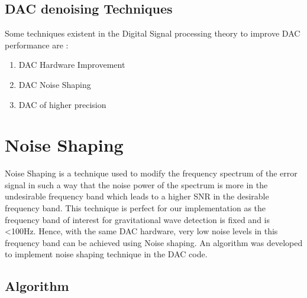 \documentclass[colorlinks=true,pdfstartview=FitV,linkcolor=blue,
            citecolor=red,urlcolor=magenta]{ligodoc}
\begin{document}
    \subsection{DAC denoising Techniques}
    Some techniques existent in the Digital Signal processing theory to improve DAC performance are :
    
    		\begin{enumerate}
    			\item DAC Hardware Improvement
    			\item DAC Noise Shaping
    			\item DAC of higher precision
    		\end{enumerate}
\section{Noise Shaping}
	Noise Shaping is a technique used to modify the frequency spectrum of the error signal in such a way that the noise power of the spectrum is more in the undesirable frequency band which leads to a higher SNR in the desirable frequency band. This technique is perfect for our implementation as the frequency band of interest for gravitational wave detection is fixed and is <100Hz. Hence, with the same DAC hardware, very low noise levels in this frequency band can be achieved using Noise shaping. An algorithm was developed to implement noise shaping technique in the DAC code. 

    \subsection{Algorithm}
\end{document}
